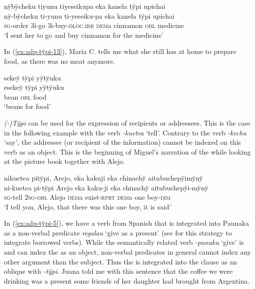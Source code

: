 \ea\label{ex:adp-tÿpi-12}
\begingl
\glpreamble nÿbÿcheku tiyunu tiyeseikupa eka kanela tÿpi upichai\\
\gla nÿ-bÿcheku ti-yunu ti-yeseiku-pa eka kanela tÿpi upichai\\
\textsc{sg}-order 3i-go 3i-buy-\textsc{dloc.irr} \textsc{dem}a cinnamon \textsc{obl} medicine\\
\glft ‘I sent her to go and buy cinnamon for the medicine’
\endgl
\trailingcitation{[jxx-e191021e-2]}
\xe

In (\ref{ex:adp-tÿpi-13}), María C. tells me what she still has at home to prepare food, as there was no meat anymore.

\ea\label{ex:adp-tÿpi-13}
\begingl
\glpreamble sekeÿ tÿpi yÿtÿuku\\
\gla esekeÿ tÿpi yÿtÿuku\\
\glb bean \textsc{obl} food\\
\glft ‘beans for food’
\endgl
\trailingcitation{[uxx-e120427l.203]}
\xe
{}

\textit{(-)Tÿpi} can be used for the expression of recipients or addressees. This is the case in the following example with the verb \textit{-kuetea} ‘tell’. Contrary to the verb \textit{-kechu} ‘say’, the addressee (or recipient of the information) cannot be indexed on this verb as an object. This is the beginning of Miguel’s narration of the  while looking at the picture book together with Alejo.

\ea\label{ex:adp-tÿpi-4}
\begingl
\glpreamble nikuetea pitÿpi, Arejo, eka kakuji eka chinachÿ aitubuchepÿimÿnÿ\\
\gla ni-kuetea pi-tÿpi Arejo eka kaku-ji eka chinachÿ aitubuchepÿi-mÿnÿ\\
\textsc{sg}-tell 2\textsc{sg}-\textsc{obl} Alejo \textsc{dem}a exist-\textsc{rprt} \textsc{dem}a one boy-\textsc{dim}\\
\glft ‘I tell you, Alejo, that there was this one boy, it is said’
\endgl
\trailingcitation{[mtx-a110906l.002]}
\xe

In (\ref{ex:adp-tÿpi-5}), we have a verb from Spanish that is integrated into Paunaka as a non-verbal predicate \textit{regalau} ‘give as a present’ (see  for this strategy to integrate borrowed verbs). While the semantically related verb \textit{-punaku} ‘give’ is  and can index the  as an object, non-verbal predicates in general cannot index any other argument than the subject. Thus the  is integrated into the clause as an oblique with \textit{-tÿpi}. Juana told me with this sentence that the coffee we were drinking was a present some friends of her daughter had brought from Argentina.

